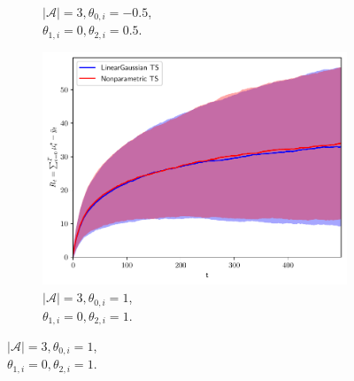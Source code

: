 \begin{figure}[!h]
\begin{subfigure}[b]{0.32\textwidth}
		\caption{$|\mathcal{A}|=3, \theta_{0,i}=-0.5$, \\ \hspace*{0.3cm}$\theta_{1,i}=0, \theta_{2,i}=0.5$.}
		\label{fig:linear_gaussian_A3_05}
	\end{subfigure}
	\begin{subfigure}[b]{0.32\textwidth}
		\includegraphics[width=\textwidth]{./figs/linearGaussian/cumregret_A3_-1_-1_0_0_1_1_1_1_1}
		\vspace*{-5ex}
		\caption{$|\mathcal{A}|=3, \theta_{0,i}=1$, \\ \hspace*{0.3cm}$\theta_{1,i}=0, \theta_{2,i}=1$.}
		\label{fig:linear_gaussian_A3_1}
	\end{subfigure}
	

\end{figure}
